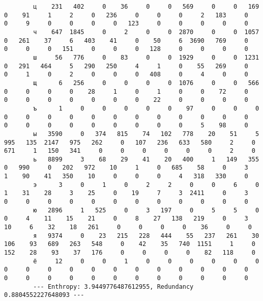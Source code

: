 \documentclass{article}
\begin{document}
\begin{landscape}
\begin{addmargin}{0em}
\begin{verbatim}
		ц    231   402     0    36     0     0   569     0     0   169     0    91     1     2     0   236     0     0     0     2   183     0     0     9     0     0     0     0   123     0     0     0     0     0
		ч    647  1845     0     2     0     0  2870     0     0  1057     0   261    37     6   403    41     0    50     6  3690   769     0     0     0     0   151     0     0     0   128     0     0     0     0
		ш     56   776     0    83     0     0  1929     0     0  1231     0   291   464     5   290   250     4     1     0    55   269     0     0     1     0     2     0     0     0   408     0     4     0     0
		щ      6   256     0     0     0     0  1076     0     0   566     0     0     0     0    28     1     0     1     0     0    72     0     0     0     0     0     0     0     0    22     0     0     0     0
		ъ      1     0     0     0     0     0    97     0     0     0     0     0     0     0     0     0     0     0     0     0     0     0     0     0     0     0     0     0     0     0     0     5    98     0
		ы   3590     0   374   815    74   102   778    20    51     5   995   135  2147   975   262     0   107   236   633   580     2     0   671     1   150   341     0     0     0     0     0     0     2     0
		ь   8899     3    68    29    41    20   400     1   149   355     0   990     0   202   972    10     1     0   685    58     0     3     1    90    41   350    10     0     0     0     4   318   330     0
		э      3     0     1     0     2     2     0     0     6     0     1    31    28     3    25     0    19     7     3  2411     0     3     0     0     0     0     0     0     0     0     0     0     0     0
		ю   2896     1   525     0     3   197     0     5     5     0     0     4    11    15    21     0     8    27   138   219     0     3    10     6    32    18   261     0     0     0     0    36     0     0
		я   9374     0    23   215   228   444    55   237   261    30   106    93   689   263   548     0    42    35   740  1151     1     0   152    28    93    37   176     0     0     0     0    82   118     0
		ё     12     0     0     1     0     0     0     0     0     0     0     0     0     0     0     0     0     0     0     0     0     0     0     0     0     0     0     0     0     0     0     0     0     0
		--- Enthropy: 3.9449776487612955, Redundancy 0.8804552227648093 ---
		
		\end{verbatim}
	\end{addmargin}
	\vspace{-2em}

\end{landscape}
\end{document}

